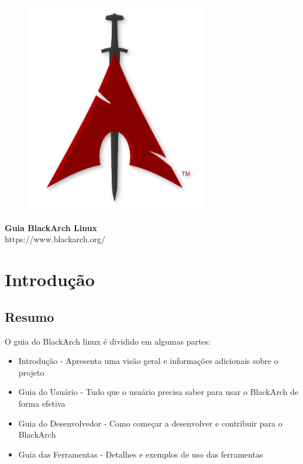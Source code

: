\documentclass[a4paper, oneside, 11pt]{book}
\begin{document}
\pagestyle{empty}
\begin{center}
\begin{figure}[htbp]
\centering
\vspace{0.5cm}
\includegraphics[width=8cm]{images/logo.png}
\label{fig:logo}
\end{figure}
\vspace{0.5cm}
\Huge{\textbf{Guia BlackArch Linux}}\\
\vspace{1cm}
\Large{\color{red}https://www.blackarch.org/}\\
\vspace{0.5cm}
\end{center}
\newpage
\tableofcontents
\newpage
\pagestyle{fancy}


\chapter{Introdução}

\section{Resumo}
O guia do BlackArch linux é dividido em algumas partes:
\begin{itemize}
\item Introdução - Apresenta uma visão geral e informações adicionais sobre o projeto
\item Guia do Usuário - Tudo que o usuário precisa saber para usar o BlackArch de forma efetiva
\item Guia do Desenvolvedor - Como começar a desenvolver e contribuir para o BlackArch
\item Guia das Ferramentas - Detalhes e exemplos de uso das ferramentas
\end{itemize}
\end{document}
